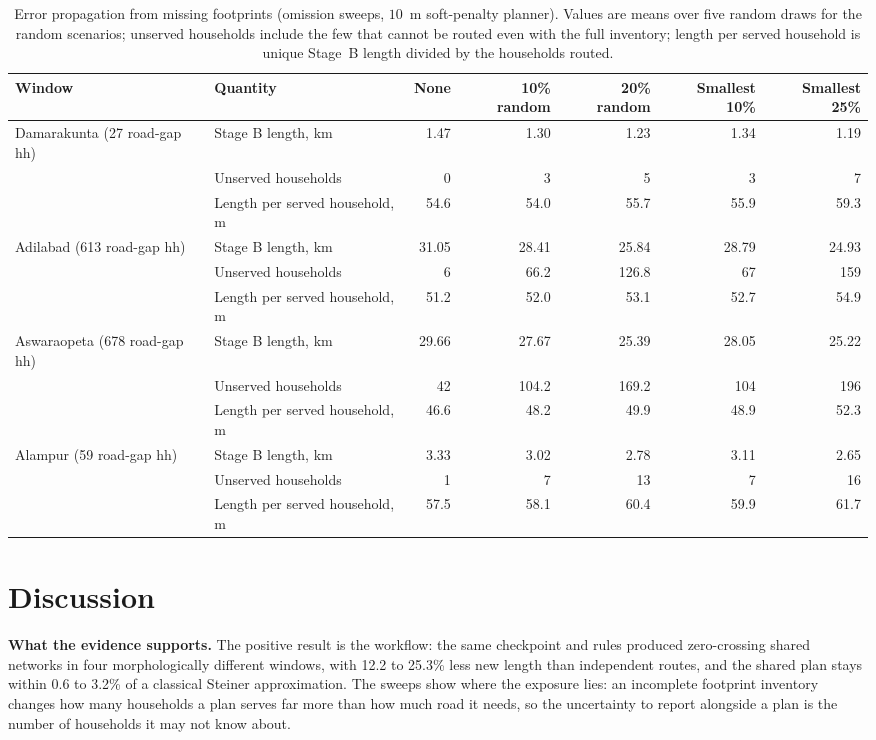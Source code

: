 \documentclass[preprint,12pt]{elsarticle}
\begin{document}
\begin{table}[htbp]
\caption{Error propagation from missing footprints (omission sweeps, $10$~m soft-penalty planner). Values are means over five random draws for the random scenarios; unserved households include the few that cannot be routed even with the full inventory; length per served household is unique Stage~B length divided by the households routed.}
\label{tab:omit}
\centering
\footnotesize
\begin{adjustbox}{max width=\textwidth}
\begin{tabular}{@{}llrrrrr@{}}
\toprule
Window & Quantity & None & 10\% random & 20\% random & Smallest 10\% & Smallest 25\%\\
\midrule
Damarakunta (27 road-gap hh) & Stage B length, km & 1.47 & 1.30 & 1.23 & 1.34 & 1.19\\
 & Unserved households & 0 & 3 & 5 & 3 & 7\\
 & Length per served household, m & 54.6 & 54.0 & 55.7 & 55.9 & 59.3\\
\addlinespace
Adilabad (613 road-gap hh) & Stage B length, km & 31.05 & 28.41 & 25.84 & 28.79 & 24.93\\
 & Unserved households & 6 & 66.2 & 126.8 & 67 & 159\\
 & Length per served household, m & 51.2 & 52.0 & 53.1 & 52.7 & 54.9\\
\addlinespace
Aswaraopeta (678 road-gap hh) & Stage B length, km & 29.66 & 27.67 & 25.39 & 28.05 & 25.22\\
 & Unserved households & 42 & 104.2 & 169.2 & 104 & 196\\
 & Length per served household, m & 46.6 & 48.2 & 49.9 & 48.9 & 52.3\\
\addlinespace
Alampur (59 road-gap hh) & Stage B length, km & 3.33 & 3.02 & 2.78 & 3.11 & 2.65\\
 & Unserved households & 1 & 7 & 13 & 7 & 16\\
 & Length per served household, m & 57.5 & 58.1 & 60.4 & 59.9 & 61.7\\
\bottomrule
\end{tabular}
\end{adjustbox}
\end{table}

\FloatBarrier
\section{Discussion}\label{sec:disc}
\textbf{What the evidence supports.} The positive result is the workflow: the same checkpoint and rules produced zero-crossing shared networks in four morphologically different windows, with 12.2 to 25.3\% less new length than independent routes, and the shared plan stays within 0.6 to 3.2\% of a classical Steiner approximation. The sweeps show where the exposure lies: an incomplete footprint inventory changes how many households a plan serves far more than how much road it needs, so the uncertainty to report alongside a plan is the number of households it may not know about.
\end{document}
